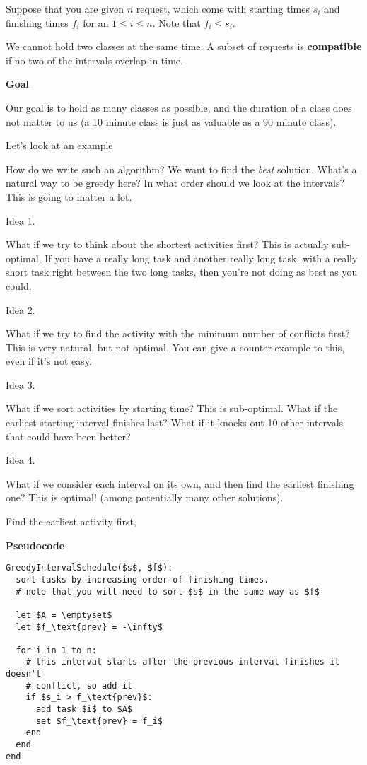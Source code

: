 \documentclass[12pt]{article}
\begin{document}
  Suppose that you are given $n$ request, which come with starting times $s_i$ and
  finishing times $f_i$ for an $1 \le i \le n$. Note that $f_i \le s_i$.

  We cannot hold two classes at the same time. A subset of requests is {\bf
  compatible} if no two of the intervals overlap in time.

  {\bf Goal}

  Our goal is to hold as many classes as possible, and the duration of a class
  does not matter to us (a 10 minute class is just as valuable as a 90 minute
  class).

  Let's look at an example



  How do we write such an algorithm? We want to find the {\it best} solution.
  What's a natural way to be greedy here? In what order should we look at the
  intervals? This is going to matter a lot.

  {\sc Idea 1}.

  What if we try to think about the shortest activities first? This is actually
  sub-optimal, If you have a really long task and another really long task, with a
  really short task right between the two long tasks, then you're not doing as
  best as you could.

  {\sc Idea 2}.

  What if we try to find the activity with the minimum number of conflicts first?
  This is very natural, but not optimal. You can give a counter example to this,
  even if it's not easy.

  {\sc Idea 3}.

  What if we sort activities by starting time? This is sub-optimal. What if the
  earliest starting interval finishes last? What if it knocks out 10 other
  intervals that could have been better?

  {\sc Idea 4}.

  What if we consider each interval on its own, and then find the earliest
  finishing one? This is optimal! (among potentially many other solutions).

  Find the earliest activity first, 

  {\bf Pseudocode}

  \begin{lstlisting}
GreedyIntervalSchedule($s$, $f$):
  sort tasks by increasing order of finishing times.
  # note that you will need to sort $s$ in the same way as $f$

  let $A = \emptyset$
  let $f_\text{prev} = -\infty$

  for i in 1 to n:
    # this interval starts after the previous interval finishes it doesn't
    # conflict, so add it
    if $s_i > f_\text{prev}$:
      add task $i$ to $A$
      set $f_\text{prev} = f_i$
    end
  end
end
  \end{lstlisting}
\end{document}
